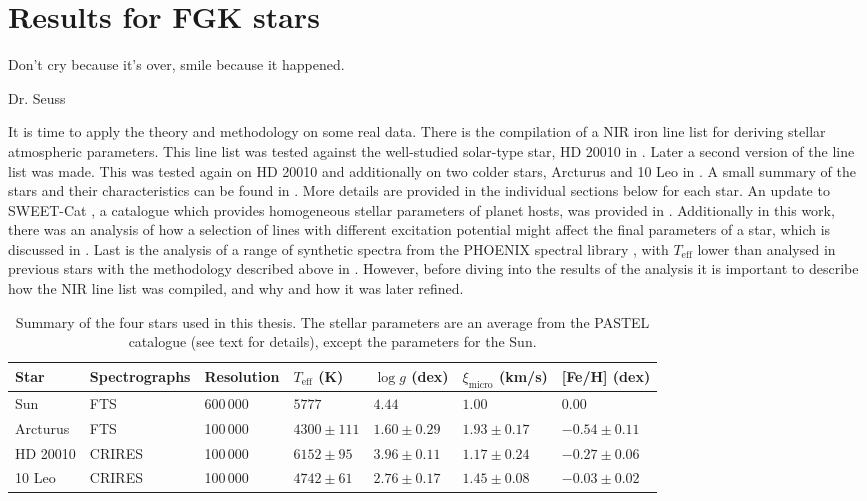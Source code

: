 
\chapter{Results for FGK stars}
\label{cha:results}
\epigraph{Don't cry because it's over, smile because it happened.}{Dr. Seuss}

It is time to apply the theory and methodology on some real data. There is the compilation of a NIR
iron line list for deriving stellar atmospheric parameters. This line list was tested against the
well-studied solar-type star, HD 20010 in \citet{Andreasen2016}. Later a second version of the line
list was made. This was tested again on HD 20010 and additionally on two colder stars, Arcturus and
10 Leo in \citet{Andreasen2017b}. A small summary of the stars and their characteristics can be
found in . More details are provided in the individual sections below for each star.
An update to SWEET-Cat \citep{Santos2013}, a catalogue which provides homogeneous stellar parameters
of planet hosts, was provided in \citet{Andreasen2017a}. Additionally in this work, there was an
analysis of how a selection of lines with different excitation potential might affect the final
parameters of a star, which is discussed in . Last is the analysis of a range of
synthetic spectra from the PHOENIX spectral library \citep{Husser2013}, with $T_\mathrm{eff}$ lower
than analysed in previous stars with the methodology described above in .
However, before diving into the results of the analysis it is important to describe how the NIR line
list was compiled, and why and how it was later refined.

\begin{table}[htb!]
    \caption{Summary of the four stars used in this thesis. The stellar parameters are an average
             from the PASTEL catalogue \citep{Soubiran2016} (see text for details), except the
             parameters for the Sun.}
    \label{tab:stars}
    \centering
    \begin{tabular}{lllllll}
      \hline\hline
        Star        & Spectrographs  & Resolution  & $T_\mathrm{eff}$ (K) &  $\log g$ (dex)  &   $\xi_\mathrm{micro}$ (km/s)   & [Fe/H] (dex)      \\
      \hline
        Sun         & FTS            & 600\,000    & $5777$               &  $4.44$          &    $1.00$                       & $ 0.00$          \\
        Arcturus    & FTS            & 100\,000    & $4300 \pm 111$       &  $1.60 \pm 0.29$ &    $1.93 \pm 0.17$              & $-0.54 \pm 0.11$ \\
        HD 20010    & CRIRES         & 100\,000    & $6152 \pm  95$       &  $3.96 \pm 0.11$ &    $1.17 \pm 0.24$              & $-0.27 \pm 0.06$ \\
        10 Leo      & CRIRES         & 100\,000    & $4742 \pm  61$       &  $2.76 \pm 0.17$ &    $1.45 \pm 0.08$              & $-0.03 \pm 0.02$ \\
      \hline
    \end{tabular}
\end{table}

